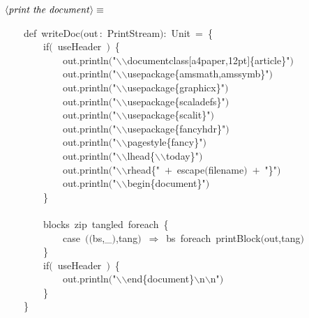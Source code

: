 \documentclass[a4paper,12pt]{article}
\begin{document}
$\left<\mbox{\emph{print the document}}\right>\equiv$
\begin{program}~~~~{\vem def}~writeDoc$($out\,{\rm :}~PrintStream$)${\rm :}~Unit~=~{\small\{}
\\~~~~~~~~{\vem if}$($~useHeader~$)$~{\small\{}
\\~~~~~~~~~~~~out.println$($"$\backslash$$\backslash$documentclass$[$a4paper,12pt$]${\small\{}article{\small\}}"$)$
\\~~~~~~~~~~~~out.println$($"$\backslash$$\backslash$usepackage{\small\{}amsmath,amssymb{\small\}}"$)$
\\~~~~~~~~~~~~out.println$($"$\backslash$$\backslash$usepackage{\small\{}graphicx{\small\}}"$)$
\\~~~~~~~~~~~~out.println$($"$\backslash$$\backslash$usepackage{\small\{}scaladefs{\small\}}"$)$
\\~~~~~~~~~~~~out.println$($"$\backslash$$\backslash$usepackage{\small\{}scalit{\small\}}"$)$
\\~~~~~~~~~~~~out.println$($"$\backslash$$\backslash$usepackage{\small\{}fancyhdr{\small\}}"$)$
\\~~~~~~~~~~~~out.println$($"$\backslash$$\backslash$pagestyle{\small\{}fancy{\small\}}"$)$
\\~~~~~~~~~~~~out.println$($"$\backslash$$\backslash$lhead{\small\{}$\backslash$$\backslash$today{\small\}}"$)$
\\~~~~~~~~~~~~out.println$($"$\backslash$$\backslash$rhead{\small\{}"~$+$~escape$($filename$)$~$+$~"{\small\}}"$)$
\\~~~~~~~~~~~~out.println$($"$\backslash$$\backslash$begin{\small\{}document{\small\}}"$)$
\\~~~~~~~~{\small\}}
\\~~~~~~~~
\\~~~~~~~~blocks~zip~tangled~foreach~{\small\{}
\\~~~~~~~~~~~~{\vem case}~$($$($bs,\_$)$,tang$)$~$\Rightarrow$~bs~foreach~printBlock$($out,tang$)$
\\~~~~~~~~{\small\}}
\\[0.5em]~~~~~~~~{\vem if}$($~useHeader~$)$~{\small\{}
\\~~~~~~~~~~~~out.println$($"$\backslash$$\backslash$end{\small\{}document{\small\}}$\backslash$n$\backslash$n"$)$
\\~~~~~~~~{\small\}}
\\~~~~{\small\}}
\\[0.5em]\end{program}
\end{document}
